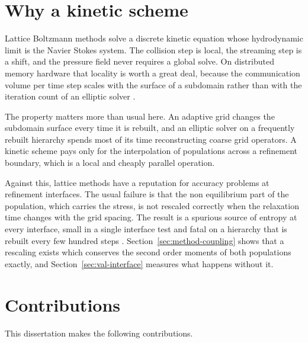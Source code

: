 \section{Why a kinetic scheme}
\label{sec:intro-kinetic}

Lattice Boltzmann methods solve a discrete kinetic equation whose hydrodynamic
limit is the Navier Stokes system. The collision step is local, the streaming
step is a shift, and the pressure field never requires a global solve. On
distributed memory hardware that locality is worth a great deal, because the
communication volume per time step scales with the surface of a subdomain rather
than with the iteration count of an elliptic solver \citep{feld2018latticeperf}.

The property matters more than usual here. An adaptive grid changes the
subdomain surface every time it is rebuilt, and an elliptic solver on a
frequently rebuilt hierarchy spends most of its time reconstructing coarse grid
operators. A kinetic scheme pays only for the interpolation of populations
across a refinement boundary, which is a local and cheaply parallel operation.

Against this, lattice methods have a reputation for accuracy problems at
refinement interfaces. The usual failure is that the non equilibrium part of the
population, which carries the stress, is not rescaled correctly when the
relaxation time changes with the grid spacing. The result is a spurious source of
entropy at every interface, small in a single interface test and fatal on a
hierarchy that is rebuilt every few hundred steps \citep{lombardi2020refine}.
Section~\ref{sec:method-coupling} shows that a rescaling exists which conserves
the second order moments of both populations exactly, and Section~\ref{sec:val-interface}
measures what happens without it.

\section{Contributions}
\label{sec:intro-contributions}

This dissertation makes the following contributions.

